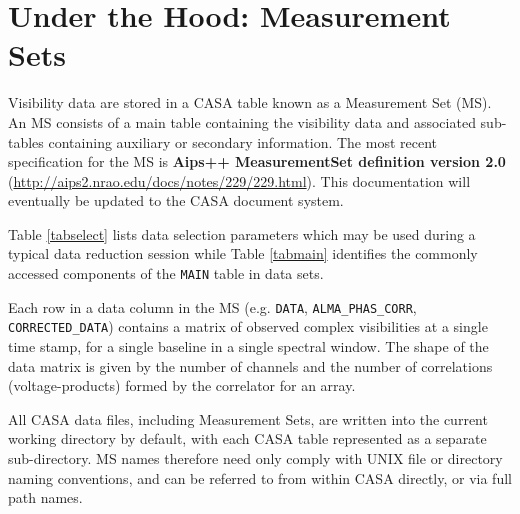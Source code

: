 

\chapter{Under the Hood: Measurement Sets}
\label{chapter:app.ms}

Visibility data are stored in a CASA table known as a
Measurement Set (MS).  An MS consists of a main table containing the
visibility data and associated sub-tables containing auxiliary or
secondary information.  The most recent specification for the MS
is {\bf Aips++ MeasurementSet definition version 2.0}
(\url{http://aips2.nrao.edu/docs/notes/229/229.html}).
This documentation will eventually be updated to the CASA 
document system.

Table \ref{tabselect} lists data selection
parameters which may be used during a typical data reduction session
while Table \ref{tabmain} identifies the commonly accessed components
of the {\tt MAIN} table in data sets.

Each row in a data column in the MS (e.g. {\tt DATA}, {\tt ALMA\_PHAS\_CORR},
{\tt CORRECTED\_DATA}) contains a matrix of observed complex visibilities at
a single time stamp, for a single baseline in a single spectral
window.  The shape of the data matrix is given by the number of
channels and the number of correlations (voltage-products) formed by
the correlator for an array.  

All CASA data files, including Measurement Sets, are written into
the current working directory by default, with each CASA table
represented as a separate sub-directory.  MS names therefore need only
comply with UNIX file or directory naming conventions, and can be
referred to from within CASA directly, or via full path names.

